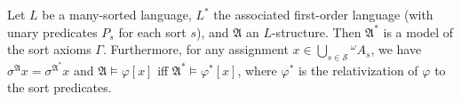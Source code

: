 Let $L$ be a many-sorted language, $L^*$ the associated first-order language (with unary predicates $P_s$ for each sort $s$), and $\mathfrak{A}$ an $L$-structure. Then $\mathfrak{A}^*$ is a model of the sort axioms $\Gamma$. Furthermore, for any assignment $x \in \bigcup_{s \in \mathcal{S}} {}^\omega A_s$, we have $\sigma^{\mathfrak{A}}x = \sigma^{\mathfrak{A}^*}x$ and $\mathfrak{A} \models \varphi[x]$ iff $\mathfrak{A}^* \models \varphi^*[x]$, where $\varphi^*$ is the relativization of $\varphi$ to the sort predicates.
